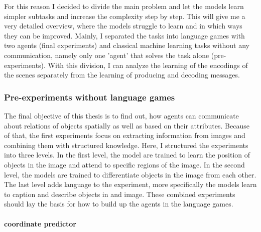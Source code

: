 For this reason I decided to divide the main problem and let the models learn simpler subtasks and increase the complexity step by step. This will give me a very detailed overview, where the models struggle to learn and in which ways they can be improved. Mainly, I separated the tasks into language games with two agents (final experiments) and classical machine learning tasks without any communication, namely only one 'agent' that solves the task alone (pre-experiments). With this division, I can analyze the learning of the encodings of the scenes separately from the learning of producing and decoding messages.

\subsubsection{Pre-experiments without language games}
The final objective of this thesis is to find out, how agents can communicate about relations of objects spatially as well as based on their attributes. Because of that, the first experiments focus on extracting information from images and combining them with structured knowledge. Here, I structured the experiments into three levels. In the first level, the model are trained to learn the position of objects in the image and attend to specific regions of the image. In the second level, the models are trained to differentiate objects in the image from each other. The last level adds language to the experiment, more specifically the models learn to caption and describe objects in and image. These combined experiments should lay the basis for how to build up the agents in the language games.

\paragraph{coordinate predictor}

